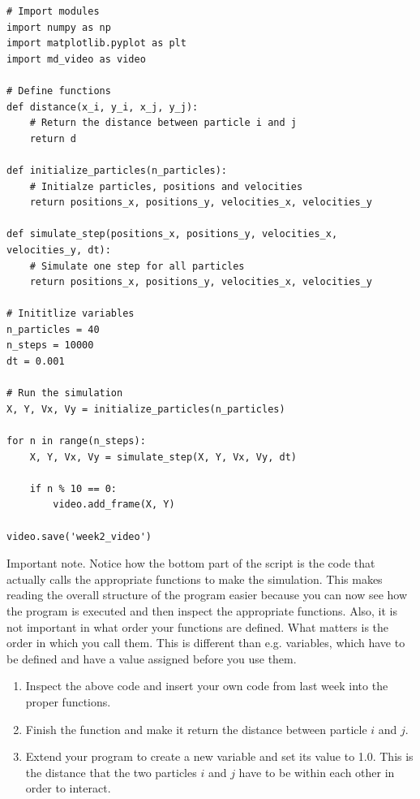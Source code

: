 \documentclass{article}
\begin{document}
\begin{lstlisting}
# Import modules
import numpy as np
import matplotlib.pyplot as plt
import md_video as video

# Define functions
def distance(x_i, y_i, x_j, y_j):
    # Return the distance between particle i and j
    return d

def initialize_particles(n_particles):
    # Initialze particles, positions and velocities
    return positions_x, positions_y, velocities_x, velocities_y

def simulate_step(positions_x, positions_y, velocities_x, velocities_y, dt):
    # Simulate one step for all particles
    return positions_x, positions_y, velocities_x, velocities_y

# Inititlize variables
n_particles = 40
n_steps = 10000
dt = 0.001

# Run the simulation
X, Y, Vx, Vy = initialize_particles(n_particles)

for n in range(n_steps):
    X, Y, Vx, Vy = simulate_step(X, Y, Vx, Vy, dt)

    if n % 10 == 0:
        video.add_frame(X, Y)

video.save('week2_video')

\end{lstlisting}

\newpage
Important note.
Notice how the bottom part of the script is the code that actually calls the
appropriate functions to make the simulation.  This makes reading the overall
structure of the program easier because you can now see how the program is
executed and then inspect the appropriate functions.  Also, it is not important
in what order your functions are defined. What matters is the order in which you
call them. This is different than e.g. variables, which have to be defined and have a value assigned before you use them.

\begin{enumerate}
  \setcounter{enumi}{0}
  \item Inspect the above code and insert your own code from last week into the proper functions.

  \item Finish the function  and make it return
    the distance  between particle $i$ and $j$.

    \item Extend your program to create a new variable  and set its
    value to 1.0.
    This is the distance that the two particles $i$ and $j$ have to be within each other
    in order to interact.

\end{enumerate}
\end{document}
